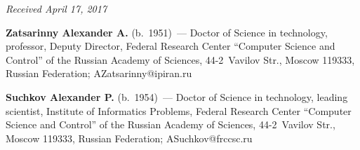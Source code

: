 \vspace*{-6pt}

\hfill{\small\textit{Received April 17, 2017}}


\Contr

\noindent
\textbf{Zatsarinny Alexander A.} (b.\ 1951)~--- Doctor of Science in technology, professor, 
Deputy Director, Federal Research Center ``Computer Science and Control'' of the Russian 
Academy of Sciences, 44-2~Vavilov Str., Moscow 119333, Russian Federation; 
\mbox{AZatsarinny@ipiran.ru}

\vspace*{3pt}

\noindent
\textbf{Suchkov Alexander P.} (b.\ 1954)~--- Doctor of Science in technology, leading 
scientist, Institute of Informatics Problems, Federal Research Center ``Computer Science and 
Control'' of the Russian Academy of Sciences, 44-2~Vavilov Str., Moscow 119333, Russian 
Federation; \mbox{ASuchkov@frccsc.ru}

\label{end\stat}


\renewcommand{\bibname}{\protect\rm Литература} 